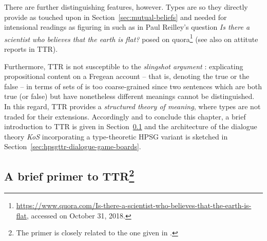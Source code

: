 \documentclass[output=paper]{langsci/langscibook}
\begin{document}
{There are further distinguishing features, however.
%
Types are  so they directly provide  as touched upon in Section~\ref{sec:mutual-beliefs} and needed for intensional readings as figuring in  such as in Paul Reilley's question \textit{Is there a scientist who believes that the earth is flat?} posed on quora\footnote{\url{https://www.quora.com/Is-there-a-scientist-who-believes-that-the-earth-is-flat}, accessed on October 31, 2018.} (see also \citet{Cooper:2005:b} on attitute reports in TTR).


Furthermore, TTR is not susceptible to the \emph{slingshot argument}  \citep[--26]{Barwise:Perry:1983}: explicating propositional content on a Fregean account \citep{Frege:1892} -- that is, denoting the true or the false -- in terms of sets of  is too coarse-grained since two sentences which are both true (or false) but have nonetheless different meanings cannot be distinguished.
%
In this regard, TTR provides a \emph{structured theory of meaning},  where types are not traded for their extensions.
%
Accordingly and to conclude this chapter, a brief introduction to TTR is given in Section~\ref{sec:brief-primer-ttr} and the architecture of the dialogue theory \emph{KoS} incorporating a type-theoretic HPSG variant is sketched in Section~\ref{sec:hpsgttr-dialogue-game-boards}.
  




  
\subsection{A brief primer to TTR\protect\footnote{The primer is closely related to the one given in \citet[Sec.~4.1]{Luecking:2018:a}.}}
\label{sec:brief-primer-ttr}

}
\end{document}
